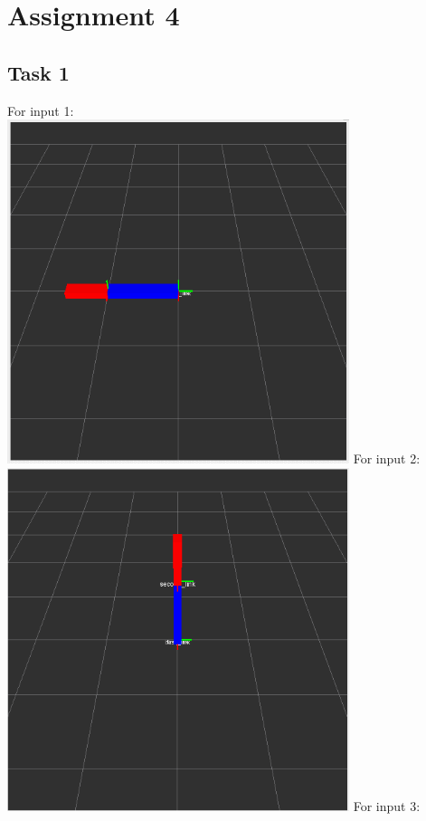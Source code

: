 \chapter{Assignment 4}\label{ass4}

\section{Task 1}\label{ass4_t1}

For input 1:\\
\includegraphics[width=0.75\textwidth]{img/screen_ue4_t1_1.png}
\newpage
For input 2:\\
\includegraphics[width=0.75\textwidth]{img/screen_ue4_t1_2.png}
\newpage
For input 3:\\
